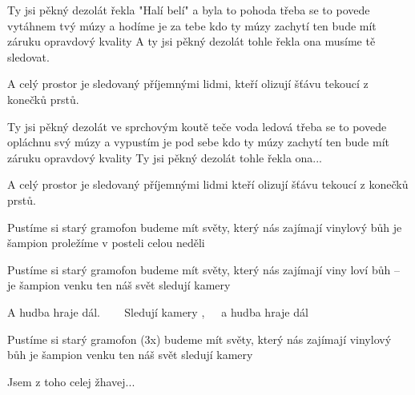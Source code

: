 \resetVars
{}
\MakeHeader
\Lyrics

Ty jsi pěkný dezolát
řekla "Halí belí" a byla to pohoda
třeba se to povede
vytáhnem tvý múzy a hodíme je za tebe
kdo ty múzy zachytí
ten bude mít záruku opravdový kvality
A ty jsi pěkný dezolát
tohle řekla ona musíme tě sledovat.

A celý prostor je sledovaný
příjemnými lidmi, kteří olizují
šťávu tekoucí z konečků prstů.

Ty jsi pěkný dezolát
ve sprchovým koutě teče voda ledová
třeba se to povede
opláchnu svý múzy a vypustím je pod sebe
kdo ty múzy zachytí
ten bude mít záruku opravdový kvality
 Ty jsi pěkný dezolát
tohle řekla ona...

A celý  prostor je sledovaný
příjemnými  lidmi kteří olizují
šťávu  tekoucí z konečků prstů.

Pustíme si starý gramofon
budeme mít světy, který nás zajímají 
vinylový bůh je šampion
proležíme v posteli celou neděli 

 Pustíme si starý gramofon
budeme mít světy, který nás zajímají 
 viny loví bůh – je šampion
venku ten náš svět sledují kamery 

A hudba hraje dál. ~~~
Sledují kamery ,~~~a hudba hraje dál ~~~

 Pustíme si starý gramofon (3x)
budeme mít světy, který nás zajímají 
vinylový  bůh je šampion
venku ten náš svět sledují kamery 

Jsem z toho celej žhavej...

\Next
